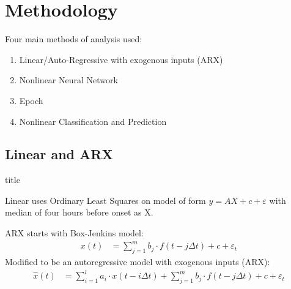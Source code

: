 \documentclass[xcolor={dvipsnames,table}]{beamer}
\newcommand{\subheader}{    		\begin{center}
  	\begin{beamercolorbox}[sep=4pt,center,shadow=true,rounded=true]{title}
  		\usebeamerfont{title}\subsecname\par%
  	\end{beamercolorbox}
  	\vfill
  	\end{center}}
\begin{document}
\section{Methodology}
\begin{frame}
Four main methods of analysis used:
\begin{enumerate}
	\item Linear/Auto-Regressive with exogenous inputs (ARX) 
	\item Nonlinear Neural Network
	\item Epoch
	\item Nonlinear Classification and Prediction
\end{enumerate}
\end{frame}

\subsection{Linear and ARX}

\begin{frame}
	\subheader
	Linear uses Ordinary Least Squares on model of form $y=AX+c+\varepsilon$ with median of four hours before onset as X. 
\newline

	ARX starts with Box-Jenkins model:
	\begin{align*}
	x(t)&=\sum_{j=1}^{m}{b_j \cdot f(t-j\Delta t)}+c + \varepsilon_t
	\end{align*}
	Modified to be an autoregressive model with exogenous inputs (ARX):
	\begin{align*}
	\hat{x}(t)&=\sum_{i=1}^la_i\cdot x(t-i\Delta t)+\sum_{j=1}^m b_j\cdot f(t-j\Delta t)+c+\varepsilon_t
	\label{ARXEqn}
	\end{align*}
\end{frame}
\end{document}
